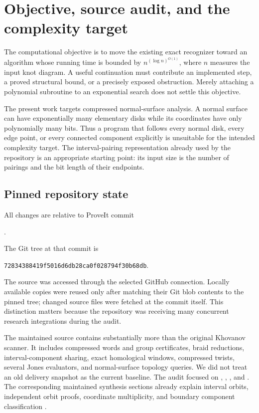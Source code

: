 \section{Objective, source audit, and the complexity target}
\label{sec:context}

The computational objective is to move the existing exact recognizer toward
an algorithm whose running time is bounded by
\(n^{(\log n)^{O(1)}}\), where \(n\) measures the input knot diagram. A useful
continuation must contribute an implemented step, a proved structural
bound, or a precisely exposed obstruction. Merely attaching a polynomial
subroutine to an exponential search does not settle this objective.

The present work targets compressed normal-surface analysis. A normal
surface can have exponentially many elementary disks while its coordinates
have only polynomially many bits. Thus a program that follows every normal
disk, every edge point, or every connected component explicitly is unsuitable
for the intended complexity target. The interval-pairing representation
already used by the repository is an appropriate starting point: its input
size is the number of pairings and the bit length of their endpoints.

\subsection{Pinned repository state}

All changes are relative to ProveIt commit
\begin{center}
\baselinecommit.
\end{center}
The  Git tree at that commit is
\begin{center}
\texttt{72834388419f5016d6db28ca0f028794f30b68db}.
\end{center}
The source was accessed through the selected GitHub connection. Locally
available copies were reused only after matching their Git blob contents to
the pinned tree; changed source files were fetched at the commit itself.
This distinction matters because the repository was receiving many concurrent
research integrations during the audit.

The maintained source contains substantially more than the original
Khovanov scanner. It includes compressed words and group certificates, braid
reductions, interval-component sharing, exact homological windows,
compressed twists, several Jones evaluators, and normal-surface topology
queries. We did not treat an old delivery snapshot as the current baseline.
The audit focused on
,
,
, and
.
The corresponding maintained synthesis sections already explain interval
orbits, independent orbit proofs, coordinate multiplicity, and boundary
component classification \cite{ProveIt2026}.

